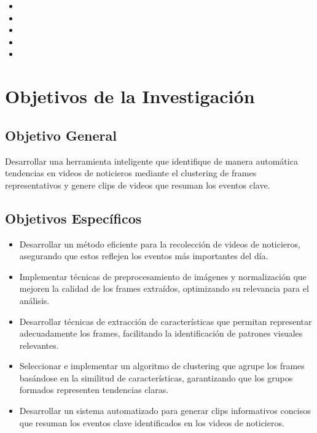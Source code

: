 \begin{itemize}
	\item \Pbone
	\item \Pbtwo
	\item \Pbthree
	\item \Pbfour
	\item \Pbfive
\end{itemize}

\section{Objetivos de la Investigación}
\subsection{Objetivo General}
\newcommand{\ObjetivoGeneral}{
	Desarrollar una herramienta inteligente que identifique de manera automática tendencias en videos de noticieros mediante el clustering de frames representativos y genere clips de videos que resuman los eventos clave.
}
\ObjetivoGeneral

\subsection{Objetivos Espec\'{i}ficos}
\newcommand{\Objone}{
	Desarrollar un método eficiente para la recolección de videos de noticieros, asegurando que estos reflejen los eventos más importantes del día.
}
\newcommand{\Objtwo}{
	Implementar técnicas de preprocesamiento de imágenes y normalización que mejoren la calidad de los frames extraídos, optimizando su relevancia para el análisis.
}
\newcommand{\Objthree}{
	Desarrollar técnicas de extracción de características que permitan representar adecuadamente los frames, facilitando la identificación de patrones visuales relevantes.
}
\newcommand{\Objtfour}{
	Seleccionar e implementar un algoritmo de clustering que agrupe los frames basándose en la similitud de características, garantizando que los grupos formados representen tendencias claras.
}
\newcommand{\Objtfive}{
	Desarrollar un sistema automatizado para generar clips informativos concisos que resuman los eventos clave identificados en los videos de noticieros.
}


\begin{itemize}
	\item {\Objone}
	\item {\Objtwo}
	\item {\Objthree}
	\item {\Objtfour}
	\item {\Objtfive}
\end{itemize}

